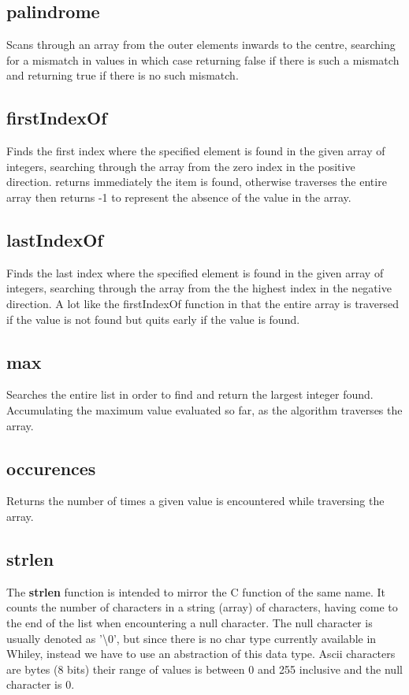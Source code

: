 \documentclass[10pt]{article} %
\begin{document}
\subsection{palindrome} 
Scans through an array from the outer elements inwards to the centre, searching for a mismatch in values in which case returning false if there is such a mismatch and returning true if there is no such mismatch.

\subsection{firstIndexOf}
Finds the first index where the specified element is found in the given array of integers, searching through the array from the zero index in the positive direction. returns immediately the item is found, otherwise traverses the entire array then returns -1 to represent the absence of the value in the array.

\subsection{lastIndexOf}
Finds the last index where the specified element is found in the given array of integers, searching through the array from the the highest index in the negative direction. A lot like the firstIndexOf function in that the entire array is traversed if the value is not found but quits early if the value is found.

\subsection{max}
Searches the entire list in order to find and return the largest integer found. Accumulating the maximum value evaluated so far, as the algorithm traverses the array. 

\subsection{occurences}
Returns the number of times a given value is encountered while traversing the array.

\subsection{strlen}
The \textbf{strlen} function is intended to mirror the C function of the same name. It counts the number of characters in a string (array) of characters, having come to the end of the list when encountering a null character. The null character is usually denoted as '\textbackslash0', but since there is no char type currently available in Whiley, instead we have to use an abstraction of this data type. Ascii characters are bytes (8 bits) their range of values is between 0 and 255 inclusive and the null character is 0.
\end{document}
